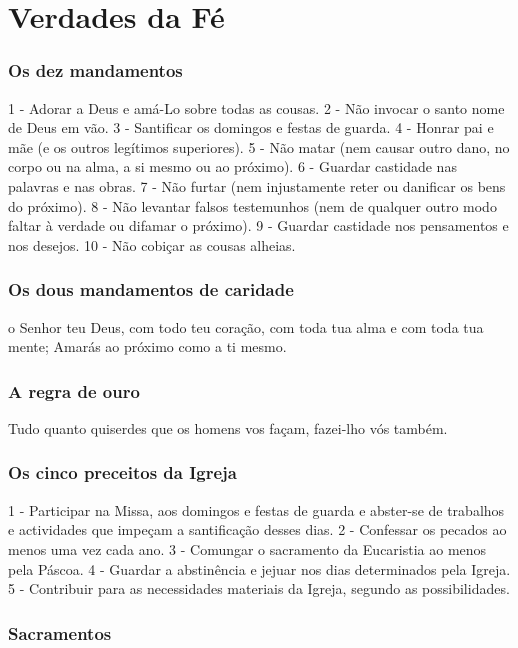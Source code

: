 \section{Verdades da Fé}

\subsubsection{Os dez mandamentos}

1 - Adorar a Deus e amá-Lo sobre todas as cousas.
2 - Não invocar o santo nome de Deus em vão.
3 - Santificar os domingos e festas de guarda.
4 - Honrar pai e mãe (e os outros legítimos superiores).
5 - Não matar (nem causar outro dano, no corpo ou na alma, a si mesmo ou ao próximo).
6 - Guardar castidade nas palavras e nas obras.
7 - Não furtar (nem injustamente reter ou danificar os bens do próximo).
8 - Não levantar falsos testemunhos (nem de qualquer outro modo faltar à verdade ou difamar o próximo).
9 - Guardar castidade nos pensamentos e nos desejos.
10 - Não cobiçar as cousas alheias.

\subsubsection{Os dous mandamentos de caridade}

 o Senhor teu Deus, com todo teu coração, com toda tua alma e com toda tua mente; Amarás ao próximo como a ti mesmo.

\subsubsection{A regra de ouro}

Tudo quanto quiserdes que os homens vos façam, fazei-lho vós também.

\subsubsection{Os cinco preceitos da Igreja}

1 - Participar na Missa, aos domingos e festas de guarda e abster-se de trabalhos e actividades que impeçam a santificação desses dias.
2 - Confessar os pecados ao menos uma vez cada ano.
3 - Comungar o sacramento da Eucaristia ao menos pela Páscoa.
4 - Guardar a abstinência e jejuar nos dias determinados pela Igreja.
5 - Contribuir para as necessidades materiais da Igreja, segundo as possibilidades.

\subsubsection{Sacramentos}

